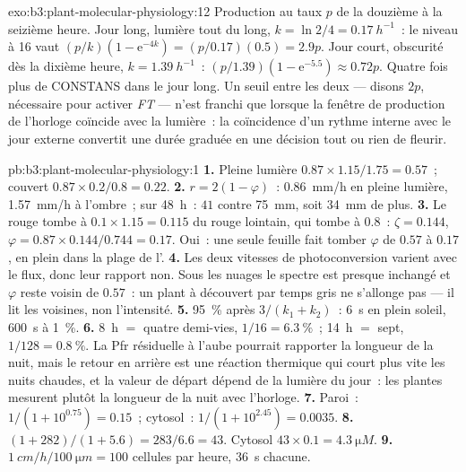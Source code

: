 \begin{solution}{exo:b3:plant-molecular-physiology:12}
Production au taux $p$ de la douzième à la seizième heure. Jour long,
lumière tout du long, $k = \ln 2/4 = \qty{0.17}{h^{-1}}$~: le niveau à
16 vaut $(p/k)(1 -
\mathrm{e}^{-4k}) = (p/0.17)(0.5) = 2.9p$. Jour court, obscurité dès la
dixième heure, $k = \qty{1.39}{h^{-1}}$~: $(p/1.39)(1 - \mathrm{e}^{-5.5})
\approx 0.72p$. Quatre fois plus de CONSTANS dans le jour long. Un seuil
entre les deux --- disons $2p$, nécessaire pour activer \emph{FT} ---
n'est franchi que lorsque la fenêtre de production de l'horloge coïncide
avec la lumière~: la coïncidence d'un rythme interne avec le jour
externe convertit une durée graduée en une décision tout ou rien de
fleurir.
\end{solution}

\begin{solution}{pb:b3:plant-molecular-physiology:1}
\textbf{1.} Pleine lumière $0.87\times 1.15/1.75 = 0.57$~; couvert $0.87\times
0.2/0.8 = 0.22$.
\textbf{2.} $r = 2(1 - \varphi)$~: \qty{0.86}{mm/h} en pleine lumière,
\qty{1.57}{mm/h} à l'ombre~; sur \qty{48}{h}~: $41$ contre \qty{75}{mm},
soit \qty{34}{mm} de plus.
\textbf{3.} Le rouge tombe à $0.1\times 1.15 = 0.115$ du rouge lointain,
qui tombe à $0.8$~: $\zeta = 0.144$, $\varphi = 0.87\times 0.144/0.744 =
0.17$. Oui~: une seule feuille fait tomber $\varphi$ de $0.57$ à $0.17$,
en plein dans la plage de l'.
\textbf{4.} Les deux vitesses de photoconversion varient avec le flux,
donc leur rapport non. Sous les nuages le spectre est presque inchangé
et $\varphi$ reste voisin de $0.57$~: un plant à découvert par temps
gris ne s'allonge pas --- il lit les voisines, non l'intensité.
\textbf{5.} \qty{95}{\%} après $3/(k_{1} + k_{2})$~: \qty{6}{s} en plein
soleil, \qty{600}{s} à \qty{1}{\%}.
\textbf{6.} \qty{8}{h} $=$ quatre demi-vies, $1/16 = \qty{6.3}{\%}$~;
\qty{14}{h} $=$ sept, $1/128 = \qty{0.8}{\%}$. La Pfr résiduelle à
l'aube pourrait rapporter la longueur de la nuit, mais le retour en
arrière est une réaction thermique qui court plus vite les nuits
chaudes, et la valeur de départ dépend de la lumière du jour~: les
plantes mesurent plutôt la longueur de la nuit avec l'horloge.
\textbf{7.} Paroi~: $1/(1 + 10^{0.75}) = 0.15$~; cytosol~: $1/(1 +
10^{2.45}) = 0.0035$.
\textbf{8.} $(1 + 282)/(1 + 5.6) = 283/6.6 = 43$. Cytosol
$43\times 0.1 = \qty{4.3}{\micro M}$.
\textbf{9.} $\qty{1}{cm/h}/\qty{100}{\micro m} = 100$ cellules par heure,
\qty{36}{s} chacune.

\end{solution}
